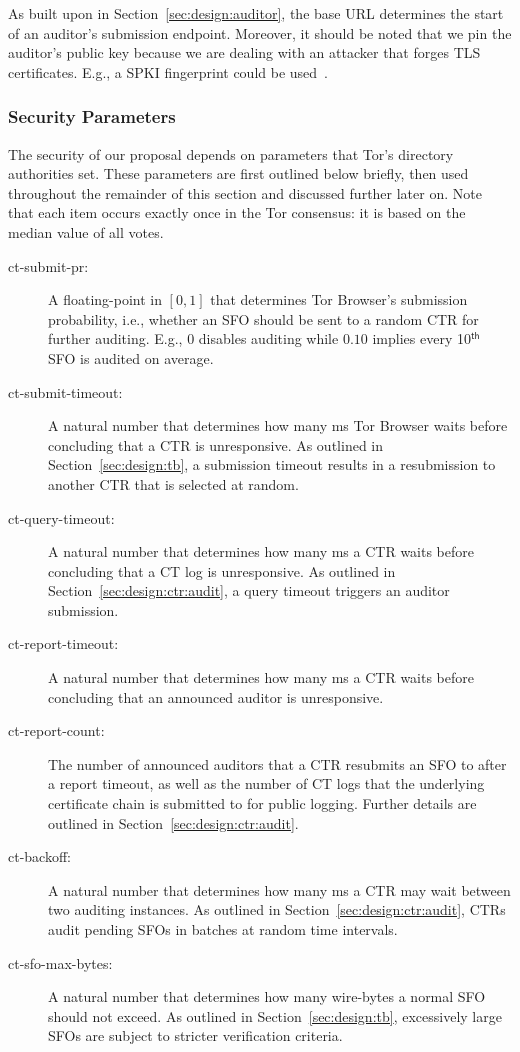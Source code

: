 As built upon in Section~\ref{sec:design:auditor}, the base URL determines the
start of an auditor's submission endpoint.  Moreover, it should be noted that
we pin the auditor's public key because we are dealing with an attacker that
forges TLS certificates.  E.g., a SPKI fingerprint could be used~\cite{hpkp}.

\subsubsection{Security Parameters}
The security of our proposal depends on parameters that Tor's directory
authorities set.  These parameters are first outlined below briefly, then used
throughout the remainder of this section and discussed further later on.
Note that each item occurs exactly once in the Tor consensus:
it is based on the median value of all votes.
\begin{description}
	\item[ct-submit-pr:] A floating-point in $[0,1]$ that determines Tor
		Browser's submission probability, i.e., whether an SFO should be sent to
		a random CTR for further auditing.  E.g., $0$ disables auditing
		while $0.10$ implies every 10$^{\mathsf{th}}$ SFO is audited
		on average.
	\item[ct-submit-timeout:] A natural number that determines how many ms Tor
		Browser waits before concluding that a CTR is unresponsive.  As
		outlined in Section~\ref{sec:design:tb}, a submission timeout results
		in a resubmission to another CTR that is selected at random.
	\item[ct-query-timeout:] A natural number that determines how many ms a CTR
		waits before concluding that a CT log is unresponsive.  As outlined in
		Section~\ref{sec:design:ctr:audit}, a query timeout triggers an
		auditor submission.
	\item[ct-report-timeout:] A natural number that determines how many ms a
		CTR waits before concluding that an announced auditor is unresponsive.
	\item[ct-report-count:] The number of announced auditors that a CTR
		resubmits an SFO to after a report timeout, as well as the number of CT
		logs that the underlying certificate chain is submitted to for public
		logging.  Further details are outlined in
		Section~\ref{sec:design:ctr:audit}.
	\item[ct-backoff:] A natural number that determines how many ms a CTR
		may wait between two auditing instances.  As outlined in
		Section~\ref{sec:design:ctr:audit}, CTRs audit pending SFOs
		in batches at random time intervals.
	\item[ct-sfo-max-bytes:] A natural number that determines how many
		wire-bytes a normal SFO should not exceed.  As outlined in
		Section~\ref{sec:design:tb}, excessively large SFOs are subject to
		stricter verification criteria.
\end{description}


